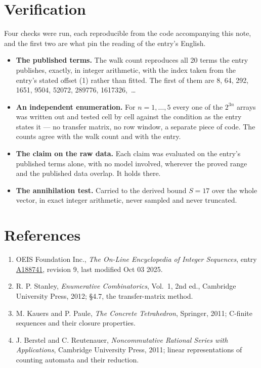 \documentclass[11pt]{article}
\theoremstyle{definition}
\begin{document}
\section{Verification}

Four checks were run, each reproducible from the code accompanying this note, and the first two are what pin the reading of the entry's English.

\begin{itemize}

\item {\bfseries The published terms.} The walk count reproduces all 20 terms the entry publishes, exactly, in integer arithmetic, with the index taken from the entry's stated offset (1) rather than fitted. The first of them are 8, 64, 292, 1651, 9504, 52072, 289776, 1617326,~\dots

\item {\bfseries An independent enumeration.} For $n = 1,\dots,5$ every one of the $2^{3n}$ arrays was written out and tested cell by cell against the condition as the entry states it --- no transfer matrix, no row window, a separate piece of code. The counts agree with the walk count and with the entry.

\item {\bfseries The claim on the raw data.} Each claim was evaluated on the entry's published terms alone, with no model involved, wherever the proved range and the published data overlap. It holds there.

\item {\bfseries The annihilation test.} Carried to the derived bound $S = 17$ over the whole vector, in exact integer arithmetic, never sampled and never truncated.

\end{itemize}

\section{References}

\begin{enumerate}

\item OEIS Foundation Inc., \emph{The On-Line Encyclopedia of Integer Sequences}, entry \href{https://oeis.org/A188741}{A188741}, revision 9, last modified Oct 03 2025.

\item R. P. Stanley, \emph{Enumerative Combinatorics}, Vol.~1, 2nd ed., Cambridge University Press, 2012; \S4.7, the transfer-matrix method.

\item M. Kauers and P. Paule, \emph{The Concrete Tetrahedron}, Springer, 2011; C-finite sequences and their closure properties.

\item J. Berstel and C. Reutenauer, \emph{Noncommutative Rational Series with Applications}, Cambridge University Press, 2011; linear representations of counting automata and their reduction.

\end{enumerate}
\end{document}
